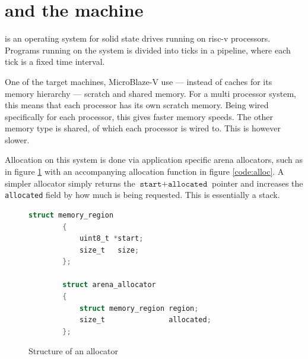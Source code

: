 \section{\ssdos and the machine}\label{sec:ssdos}


\ssdos is an operating system for solid state drives running on risc-v
processors.
Programs running on the system is divided into ticks in a pipeline, where each
tick is a fixed time interval.

One of the target machines, MicroBlaze-V\cite{sigma} use --- instead of caches
for its memory hierarchy --- scratch and shared memory.
For a multi processor system, this means that each processor has its own
scratch memory. Being wired specifically for each processor, this gives faster
memory speeds. The other memory type is shared, of which each processor is
wired to. This is however slower.

Allocation on this system is done via application specific arena allocators,
such as in figure \ref{code:arena} with an accompanying allocation function in
figure \ref{code:alloc}. A simpler allocator simply returns the $\texttt{start}
+ \texttt{allocated}$  pointer and increases the \texttt{allocated} field by
how much is being requested.
This is essentially a stack.



% 
% 
\begin{figure}
    \begin{lstlisting}[language=C, gobble=4]
        struct memory_region
        {
            uint8_t *start;
            size_t   size;
        };

        struct arena_allocator
        {
            struct memory_region region;
            size_t               allocated;
        };
    \end{lstlisting}
    \caption{Structure of an allocator}
    \label{code:arena}
\end{figure}

